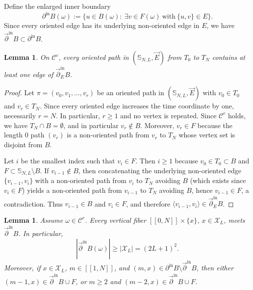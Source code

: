 \documentclass[11pt]{amsart}
\newtheorem{lemma}[theorem]{Lemma}
\theoremstyle{definition}
\numberwithin{equation}{section}
\newcommand{\Sbb}{\mathbb{S}}
\newcommand{\mrm}[1]{\mathrm{#1}}
\newcommand{\1}{\mathbbm{1}}
\newcommand{\arrow}[1]{\overrightarrow{#1}}
\newcommand{\arpartial}{\arrow{\partial}}
\newcommand{\Chi}{\mathcal{X}}
\begin{document}
Define the enlarged inner boundary
\[\partial^{\mrm{in}} B(\omega):=\{u\in B(\omega):\ \exists v\in F(\omega)\ \text{with}\ \{u,v\}\in E\}. \]
Since every oriented edge has its underlying non-oriented edge in $E$, we have $\arpartial^{\mrm{in}} B\subset \partial^{\mrm{in}} B$. 




\begin{lemma}\label{lem:cutset}
On $\mathcal C^c$, every oriented path in $(\Sbb_{N,L},\arrow{E})$ from $T_0$ to $T_N$ contains at least one edge of $\arpartial_E^{\mrm{in}} B$.
\end{lemma}

\begin{proof}
Let $\pi=(v_0,v_1,\dots,v_r)$ be an oriented path in $(\Sbb_{N,L},\arrow{E})$ with $v_0\in T_0$ and $v_r\in T_N$.
Since every oriented edge increases the time coordinate by one, necessarily
$r=N$. In particular, $r\ge 1$ and no vertex is repeated.
Since $\mathcal C^c$ holds, we have $T_N\cap B=\emptyset$, and in particular $v_r\notin B$.
Moreover, $v_r\in F$ because the length $0$ path $(v_r)$ is a non-oriented path from $v_r$ to $T_N$ whose vertex set is disjoint from $B$.

Let $i$ be the smallest index such that $v_i\in F$. Then $i\ge 1$ because $v_0\in T_0\subset B$ and $F\subset \Sbb_{N,L}\setminus B$.
If $v_{i-1}\notin B$, then concatenating the underlying non-oriented edge $\{v_{i-1},v_i\}$ with a non-oriented path from $v_i$ to $T_N$ avoiding $B$
(which exists since $v_i\in F$) yields a non-oriented path from $v_{i-1}$ to $T_N$ avoiding $B$, hence $v_{i-1}\in F$, a contradiction.
Thus $v_{i-1}\in B$ and $v_i\in F$, and therefore $\langle v_{i-1},v_i\rangle\in \arpartial_E^{\mrm{in}} B$.
\end{proof}

\begin{lemma}\label{lem:lowerbd}
Assume $\omega\in\mathcal C^c$. Every vertical fiber $[\![0,N]\!]\times\{x\}$, $x\in \Chi_L$, meets $\arpartial^{\mrm{in}} B$. In particular,
\[
|\arpartial^{\mrm{in}} B(\omega)|\ge |\Chi_L|=(2L+1)^2.
\]
Moreover, if $x\in \Chi_L$, $m\in[\![1,N]\!]$, and
$(m,x)\in \partial^{\mrm{in}} B\setminus \arpartial^{\mrm{in}} B$, then either
$(m-1,x)\in \arpartial^{\mrm{in}} B\cup F$, or
$m\ge 2$ and $(m-2,x)\in \arpartial^{\mrm{in}} B\cup F$.
\end{lemma}
\end{document}
